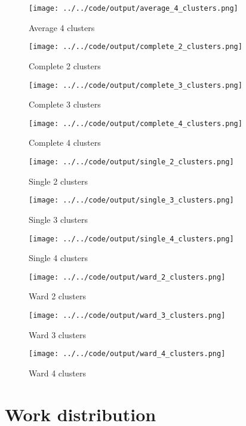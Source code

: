 \documentclass[twoside, a4paper, fleqn, reqno]{article}
\begin{document}
\begin{figure}
	\centering
	\texttt{[image: ../../code/output/average\_4\_clusters.png]}
	\caption{Average 4 clusters}
	\label{fig:2:average_4_clusters}
\end{figure}

\begin{figure}
	\centering
	\texttt{[image: ../../code/output/complete\_2\_clusters.png]}
	\caption{Complete 2 clusters}
	\label{fig:2:complete_2_clusters}
\end{figure}

\begin{figure}
	\centering
	\texttt{[image: ../../code/output/complete\_3\_clusters.png]}
	\caption{Complete 3 clusters}
	\label{fig:2:complete_3_clusters}
\end{figure}

\begin{figure}
	\centering
	\texttt{[image: ../../code/output/complete\_4\_clusters.png]}
	\caption{Complete 4 clusters}
	\label{fig:2:complete_4_clusters}
\end{figure}

\begin{figure}
	\centering
	\texttt{[image: ../../code/output/single\_2\_clusters.png]}
	\caption{Single 2 clusters}
	\label{fig:2:single_2_clusters}
\end{figure}

\begin{figure}
	\centering
	\texttt{[image: ../../code/output/single\_3\_clusters.png]}
	\caption{Single 3 clusters}
	\label{fig:2:single_3_clusters}
\end{figure}

\begin{figure}
	\centering
	\texttt{[image: ../../code/output/single\_4\_clusters.png]}
	\caption{Single 4 clusters}
	\label{fig:2:single_4_clusters}
\end{figure}

\begin{figure}
	\centering
	\texttt{[image: ../../code/output/ward\_2\_clusters.png]}
	\caption{Ward 2 clusters}
	\label{fig:2:ward_2_clusters}
\end{figure}

\begin{figure}
	\centering
	\texttt{[image: ../../code/output/ward\_3\_clusters.png]}
	\caption{Ward 3 clusters}
	\label{fig:2:ward_3_clusters}
\end{figure}

\begin{figure}
	\centering
	\texttt{[image: ../../code/output/ward\_4\_clusters.png]}
	\caption{Ward 4 clusters}
	\label{fig:2:ward_4_clusters}
\end{figure}

\section*{Work distribution}

\end{document}

